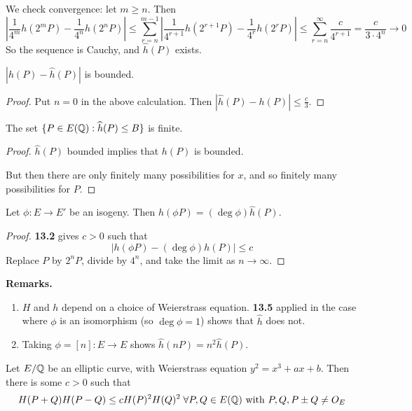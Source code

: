 \documentclass[10pt,a4paper]{article}
\begin{document}
We check convergence: let $m \geq n$. Then
\[|\frac{1}{4^m} h(2^m P) - \frac{1}{4^n}h(2^nP)| \leq \sum_{r=n}^{m-1}|\frac{1}{4^{r+1}}h(2^{r+1}P) - \frac{1}{4^r}h(2^r P)| \leq \sum_{r=n}^{\infty}\frac{c}{4^{r+1}} = \frac{c}{3\cdot 4^n} \to 0\]
So the sequence is Cauchy, and $\hat{h}(P)$ exists.
\begin{lemma}
  $|h(P)-\hat{h}(P)|$ is bounded.
\end{lemma}
\begin{proof}
  Put $n=0$ in the above calculation. Then $|\hat{h}(P) - h(P)| \leq \frac{c}{3}$.
\end{proof}
\begin{corollary}
  The set $\{P \in E(\mathbb{Q}) : \widehat{h}(P) \leq B\}$ is finite.
\end{corollary}
\begin{proof}
  $\hat{h}(P)$ bounded implies that $h(P)$ is bounded.

  But then there are only finitely many possibilities for $x$, and so finitely many possibilities for $P$.
\end{proof}
\begin{lemma}
  Let $\phi : E \to E'$ be an isogeny. Then $\hat{h}(\phi P) = (\deg \phi)\hat{h}(P)$.
\end{lemma}
\begin{proof}
  \textbf{13.2} gives $c > 0$ such that
  \[|h(\phi P) - (\deg \phi)h(P)| \leq c\]
  Replace $P$ by $2^n P$, divide by $4^n$, and take the limit as $n \to \infty$.
\end{proof}
\textbf{Remarks.}
\begin{enumerate}
  \item $H$ and $h$ depend on a choice of Weierstrass equation. \textbf{13.5} applied in the case where $\phi$ is an isomorphism (so $\deg \phi = 1$) shows that $\hat{h}$ does not.
  \item Taking $\phi = [n]:E \to E$ shows $\hat{h}(nP) = n^2\hat{h}(P)$.
\end{enumerate}
\begin{lemma}
  Let $E/\mathbb{Q}$ be an elliptic curve, with Weierstrass equation $y^2=x^3+ax+b$. Then there is some $c > 0$ such that
  \[H(P+Q)H(P-Q) \leq cH(P)^2 H(Q)^2 \forall P, Q \in E(\Q)\text{ with }P,Q,P\pm Q \neq O_E\]
\end{lemma}
\end{document}
